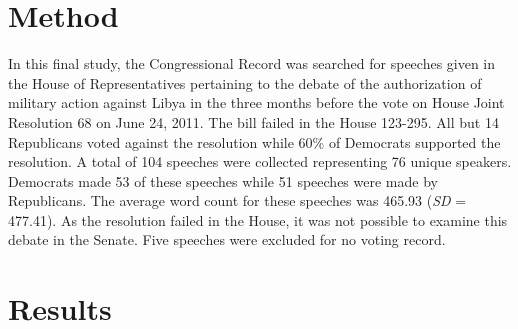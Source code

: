 \documentclass[
  english,
  ,man,floatsintext]{apa6}
\begin{document}
\hypertarget{method-4}{%
\section{Method}\label{method-4}}

In this final study, the Congressional Record was searched for speeches given in the House of Representatives pertaining to the debate of the authorization of military action against Libya in the three months before the vote on House Joint Resolution 68 on June 24, 2011. The bill failed in the House 123-295. All but 14 Republicans voted against the resolution while 60\% of Democrats supported the resolution. A total of 104 speeches were collected representing 76 unique speakers. Democrats made 53 of these speeches while 51 speeches were made by Republicans. The average word count for these speeches was 465.93 (\emph{SD} = 477.41). As the resolution failed in the House, it was not possible to examine this debate in the Senate. Five speeches were excluded for no voting record.

\hypertarget{results-4}{%
\section{Results}\label{results-4}}
\end{document}
